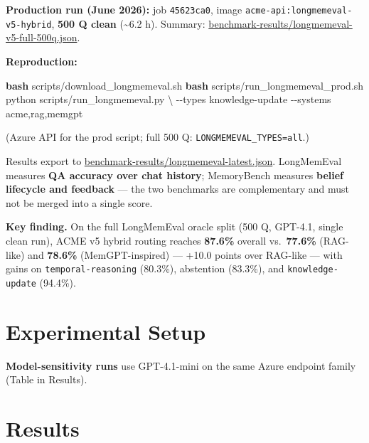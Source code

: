 \documentclass[11pt,a4paper]{article}
\newenvironment{Shaded}{\begin{snugshade}}{\end{snugshade}}
\newcommand{\AttributeTok}[1]{\textcolor[rgb]{0.13,0.29,0.53}{#1}}
\newcommand{\DataTypeTok}[1]{\textcolor[rgb]{0.13,0.29,0.53}{#1}}
\newcommand{\ExtensionTok}[1]{#1}
\newcommand{\FunctionTok}[1]{\textcolor[rgb]{0.13,0.29,0.53}{\textbf{#1}}}
\newcommand{\NormalTok}[1]{#1}
\renewenvironment{Shaded}{%
  \begin{tcolorbox}[%
    enhanced,breakable,%
    colback=shadecolor,colframe=shadecolor,boxrule=0pt,%
    left=4pt,right=4pt,top=4pt,bottom=4pt,arc=2pt,%
    width=\linewidth,before skip=0.45em,after skip=0.55em]%
}{%
  \end{tcolorbox}%
}
\begin{document}
\textbf{Production run (June 2026):} job \texttt{45623ca0}, image
\texttt{acme-api:longmemeval-v5-hybrid}, \textbf{500 Q clean}
(\textasciitilde6.2 h). Summary:
\url{benchmark-results/longmemeval-v5-full-500q.json}.

\textbf{Reproduction:}

\begin{Shaded}
\begin{Highlighting}[]
\FunctionTok{bash}\NormalTok{ scripts/download\_longmemeval.sh}
\FunctionTok{bash}\NormalTok{ scripts/run\_longmemeval\_prod.sh}
\ExtensionTok{python}\NormalTok{ scripts/run\_longmemeval.py }\DataTypeTok{\textbackslash{}}
  \AttributeTok{{-}{-}types}\NormalTok{ knowledge{-}update }\AttributeTok{{-}{-}systems}\NormalTok{ acme,rag,memgpt}
\end{Highlighting}
\end{Shaded}

(Azure API for the prod script; full 500 Q:
\texttt{LONGMEMEVAL\_TYPES=all}.)

Results export to \url{benchmark-results/longmemeval-latest.json}.
LongMemEval measures \textbf{QA accuracy over chat history}; MemoryBench
measures \textbf{belief lifecycle and feedback} --- the two benchmarks
are complementary and must not be merged into a single score.

\begin{keyfinding}
\textbf{Key finding.} On the full LongMemEval oracle split (500 Q, GPT-4.1, single clean run), ACME v5 hybrid routing reaches \textbf{87.6\%} overall vs.\ \textbf{77.6\%} (RAG-like) and \textbf{78.6\%} (MemGPT-inspired) --- +10.0 points over RAG-like --- with gains on \texttt{temporal-reasoning} (80.3\%), abstention (83.3\%), and \texttt{knowledge-update} (94.4\%).
\end{keyfinding}

\section{Experimental Setup}\label{experimental-setup}

\acmeTableSetup

\textbf{Model-sensitivity runs} use GPT-4.1-mini on the same Azure
endpoint family (Table in Results).

\FloatBarrier

\section{Results}\label{results}
\end{document}
